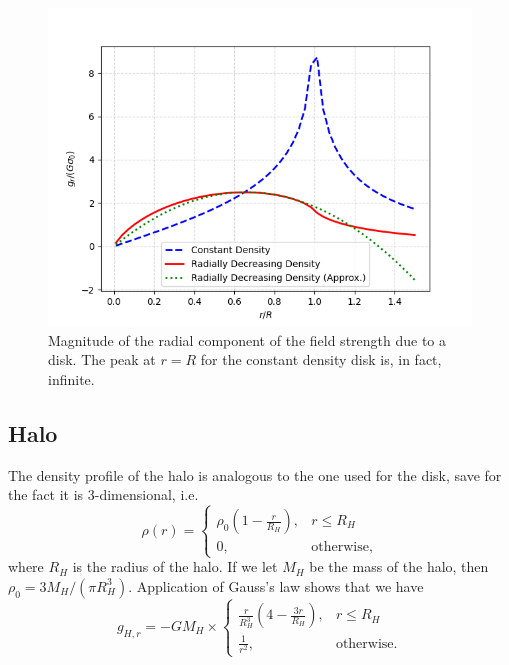 \begin{figure}[htp]
    \centering
    \includegraphics[scale=0.6]{chapters/test-models/img/disk-field.png}
    \caption{Magnitude of the radial component of the field strength due to a disk.
        The peak at $r=R$ for the constant density disk is, in fact, infinite.}
    \label{fig:radial-strength-disk}
\end{figure}

\subsection{Halo}
The density profile of the halo is analogous to the one used for the disk, save for the fact it is 3-dimensional, i.e.
\begin{equation*}
    \rho(r) =
    \begin{cases}
        \rho_0\left(1 - \frac{r}{R_H}\right), & r \leq R_H        \\
        0,                                    & \text{otherwise},
    \end{cases}
\end{equation*}
where $R_H$ is the radius of the halo.
If we let $M_H$ be the mass of the halo, then $\rho_0 = 3M_H / (\pi R_H^3)$.
Application of Gauss's law shows that we have
\begin{equation*}
    g_{H,r} = -G M_H \times
    \begin{cases}
        \frac{r}{R_H^3}\left(4 - \frac{3r}{R_H}\right), & r \leq R_H        \\
        \frac{1}{r^2},                                  & \text{otherwise}.
    \end{cases}
\end{equation*}

